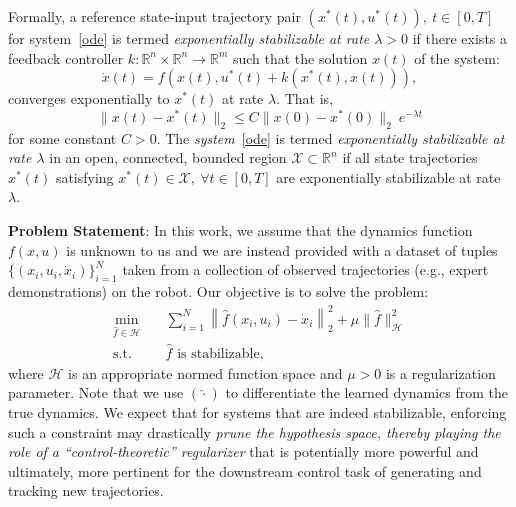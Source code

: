 \documentclass[conference]{svproc}
\newcommand{\ssmargin}[2]{{\color{blue}#1}{\marginpar{\color{blue}\raggedright\scriptsize [SS] #2 \par}}}
\newcommand{\X}{\mathcal{X}}
\newcommand{\reals}{\mathbb{R}}
\newcommand{\xs}{x_i}
\newcommand{\us}{u_i}
\begin{document}
%
\iffalse
Consider a robotic system whose dynamics are described by the generic nonlinear differential equation
\begin{equation}
    \dot{x}(t) = f(x(t),u(t)), 
\label{ode}
\end{equation}
where $x \in \reals^n$ is the state, $u \in \reals^m$ is the control input. We assume that the function $f$ is smooth. A state-input trajectory satisfying~\eqref{ode} is denoted as the pair $(x,u)$. The key concept leveraged in this work is the notion of \emph{stabilizability}. 
\fi
Formally, a reference state-input trajectory pair $(x^*(t), u^*(t)),\ t \in [0,T]$ for system~\eqref{ode} is termed \emph{exponentially stabilizable at rate $\lambda>0$} if there exists a feedback controller $k : \reals^n \times \reals^n \rightarrow \reals^m$ such that the solution $x(t)$ of the system:
\[
    \dot{x}(t) = f(x(t), u^*(t) + k(x^*(t),x(t))),
\]
converges exponentially to $x^*(t)$ at rate $\lambda$. That is,
\begin{equation}
    \|x(t) - x^*(t)\|_2 \leq C \|x(0) - x^*(0)\|_2 \ e^{-\lambda t}
\label{exp_stab}
\end{equation}
for some constant $C>0$. The \emph{system}~\eqref{ode} is termed \emph{exponentially stabilizable at rate $\lambda$} in an open, connected, bounded region $\X \subset \reals^n$ if all state trajectories $x^*(t)$ satisfying $x^*(t) \in \X,\ \forall t \in [0,T]$ are exponentially stabilizable at rate $\lambda$. 


{\bf Problem Statement}: In this work, we assume that the dynamics function $f(x,u)$ is unknown to us and we are instead provided with a dataset of tuples $\{(\xs, \us, \dot{x}_i)\}_{i=1}^{N}$ taken from a collection of observed trajectories (e.g., expert demonstrations) on the robot. Our objective is to solve the problem:
\begin{align}
    \min_{\hat{f} \in \mathcal{H}} \quad & \sum_{i=1}^{N} \left\| \hat{f}(\xs,\us) - \dot{x}_i \right\|_2^2 + \mu \|\hat{f}\|^2_{\mathcal{H}} \label{prob_gen} \\
    \text{s.t.} \quad & \text{$\hat{f}$ is stabilizable,}
\end{align}
where $\mathcal{H}$ is an appropriate normed function space and $\mu >0$ is a regularization parameter. Note that we use $(\hat{\cdot})$ to differentiate the learned dynamics from the true dynamics. We expect that for systems that are indeed stabilizable, enforcing such a constraint may drastically \emph{prune the hypothesis space, thereby playing the role of a ``control-theoretic'' regularizer} that is potentially more powerful and ultimately, more pertinent for the downstream control task of generating and tracking new trajectories.
 
\end{document}
